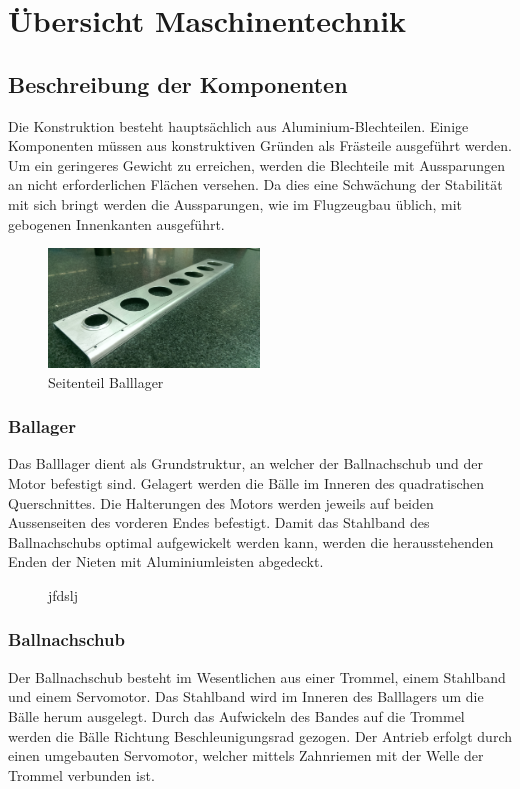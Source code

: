 \section{Übersicht Maschinentechnik}

\subsection{Beschreibung der Komponenten}

Die Konstruktion besteht hauptsächlich aus Aluminium-Blechteilen. Einige Komponenten müssen aus konstruktiven Gründen als Frästeile ausgeführt werden. Um ein geringeres Gewicht zu erreichen, werden die Blechteile mit Aussparungen an nicht erforderlichen Flächen versehen. Da dies eine Schwächung der Stabilität mit sich bringt werden die Aussparungen, wie im Flugzeugbau üblich, mit gebogenen Innenkanten ausgeführt.

\begin{figure}[h!]          
	\centering             
	\includegraphics[width=0.5\textwidth]{fig/IMAG0364.jpg}
	\caption{Seitenteil Balllager}
	\label{fig:Seitenteil Balllager}        
\end{figure}

\subsubsection{Ballager}
Das Balllager dient als Grundstruktur, an welcher der Ballnachschub und der 
Motor befestigt sind. Gelagert werden die Bälle im Inneren des quadratischen 
Querschnittes. Die Halterungen des Motors werden jeweils auf beiden 
Aussenseiten des vorderen Endes befestigt. Damit das Stahlband des 
Ballnachschubs optimal aufgewickelt werden kann, werden die herausstehenden 
Enden der Nieten mit Aluminiumleisten abgedeckt.

\begin{figure}[h!]          
	\centering             
	\caption{jfdslj}
	\label{fig:hhjfdhfd}        
\end{figure}

\subsubsection{Ballnachschub}
Der Ballnachschub besteht im Wesentlichen aus einer Trommel, einem Stahlband 
und einem Servomotor. Das Stahlband wird im Inneren des Balllagers um die 
Bälle herum ausgelegt. Durch das Aufwickeln des Bandes auf die Trommel werden 
die Bälle Richtung Beschleunigungsrad gezogen. Der Antrieb erfolgt durch einen 
umgebauten Servomotor, welcher mittels Zahnriemen mit der Welle der Trommel 
verbunden ist.

